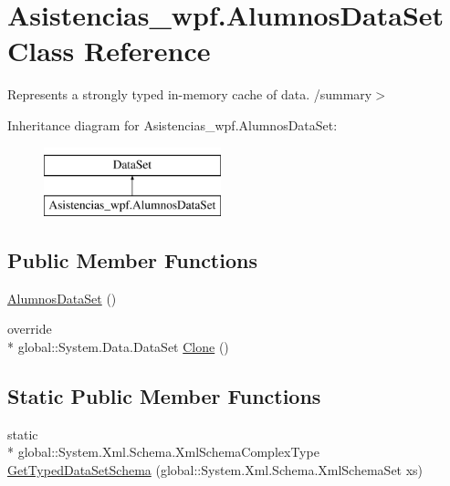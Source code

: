 \hypertarget{class_asistencias__wpf_1_1_alumnos_data_set}{\section{Asistencias\-\_\-wpf.\-Alumnos\-Data\-Set Class Reference}
\label{class_asistencias__wpf_1_1_alumnos_data_set}
}


Represents a strongly typed in-\/memory cache of data. /summary$>$  


Inheritance diagram for Asistencias\-\_\-wpf.\-Alumnos\-Data\-Set\-:\begin{figure}[H]
\begin{center}
\leavevmode
\includegraphics[height=2.000000cm]{d6/d98/class_asistencias__wpf_1_1_alumnos_data_set}
\end{center}
\end{figure}
\subsection*{Public Member Functions}
\begin{DoxyCompactItemize}
\item 
\hyperlink{class_asistencias__wpf_1_1_alumnos_data_set_a2d47f7c2a65b0ef4a5f1d70feb28751c}{Alumnos\-Data\-Set} ()
\item 
override \\*
global\-::\-System.\-Data.\-Data\-Set \hyperlink{class_asistencias__wpf_1_1_alumnos_data_set_a8e965005fd3afa7c757feee5bce7361b}{Clone} ()
\end{DoxyCompactItemize}
\subsection*{Static Public Member Functions}
\begin{DoxyCompactItemize}
\item 
static \\*
global\-::\-System.\-Xml.\-Schema.\-Xml\-Schema\-Complex\-Type \hyperlink{class_asistencias__wpf_1_1_alumnos_data_set_a11d8464b2c094ddc6d16345c8b38f1dd}{Get\-Typed\-Data\-Set\-Schema} (global\-::\-System.\-Xml.\-Schema.\-Xml\-Schema\-Set xs)
\end{DoxyCompactItemize}
